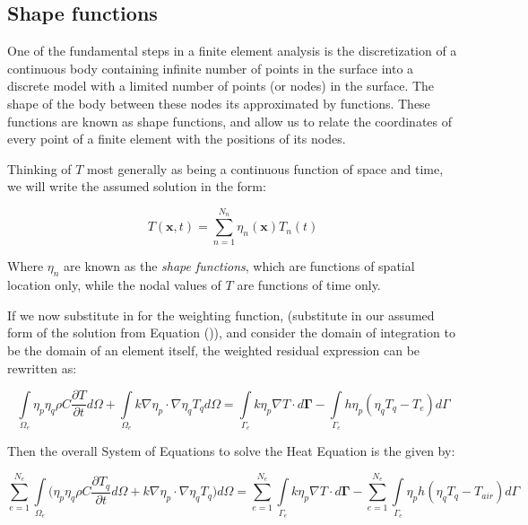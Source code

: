 \documentclass[12pt]{article}
\begin{document}
	\subsection{Shape functions}

One of the fundamental steps in a finite element analysis is the discretization of a continuous body containing infinite number of points in the surface into a discrete model with a limited number of points (or nodes) in the surface. The shape of the body between these nodes its approximated by functions. These functions are known as shape functions, and allow us to relate the coordinates of every point of a finite element with the positions of its nodes.

Thinking of $T$ most generally as being a continuous function of space and time, we will write the assumed solution in the form:

\begin{equation}
T(\mathbf{x},t) = \sum_{n=1}^{N_n} \eta_n(\mathbf{x})T_n(t)
\end{equation}

Where $\eta_n$ are known as the \textsl{shape functions}, which are functions of spatial location only, while the nodal values of $T$ are functions of time only. 

If we now substitute in for the weighting function, (substitute in our assumed form of the solution from Equation ()), and consider the domain of integration to be the domain of an element itself, the weighted residual expression can be rewritten as:

	\begin{equation}
	\int\limits_{\Omega_e} \eta_p\eta_q \rho C \frac{\partial T}{\partial t} d\Omega + \int\limits_{\Omega_e} k \nabla \eta_p \cdot \nabla \eta_q T_q d\Omega = \int\limits_{\Gamma_{e}}{k\eta_p\nabla T} \cdot d \mathbf{\Gamma} - \int\limits_{\Gamma_{e}}h\eta_p(\eta_qT_q-T_{e}) d\Gamma
	\end{equation}


Then the overall System of Equations to solve the Heat Equation is the given by:

\begin{equation}
	\sum_{e=1}^{N_e}  \int\limits_{\Omega_e} \bigg(\eta_p\eta_q \rho C \frac{\partial T_q}{\partial t} d\Omega + k \nabla \eta_p \cdot \nabla \eta_q T_q\bigg) d\Omega = \sum_{e=1}^{N_e} \int\limits_{\Gamma_{e}}{k\eta_p\nabla T} \cdot d \mathbf{\Gamma} - \sum_{e=1}^{N_e} \int\limits_{\Gamma_{e}}\eta_p h (\eta_qT_q-T_{air}) d\Gamma
	\end{equation}
\end{document}
